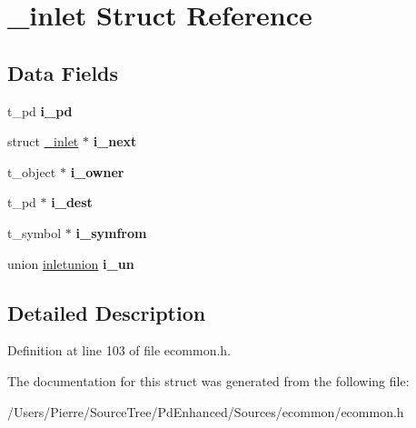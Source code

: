 \hypertarget{struct__inlet}{\section{\-\_\-inlet Struct Reference}
\label{struct__inlet}
}
\subsection*{Data Fields}
\begin{DoxyCompactItemize}
\item 
\hypertarget{struct__inlet_a2639bb3ac2a63922bf7393a675b28fd1}{t\-\_\-pd {\bfseries i\-\_\-pd}}\label{struct__inlet_a2639bb3ac2a63922bf7393a675b28fd1}

\item 
\hypertarget{struct__inlet_adb58549077d98b479e51d877e316ed31}{struct \hyperlink{struct__inlet}{\-\_\-inlet} $\ast$ {\bfseries i\-\_\-next}}\label{struct__inlet_adb58549077d98b479e51d877e316ed31}

\item 
\hypertarget{struct__inlet_aee881cb1182ca7632e843f9eb4503b30}{t\-\_\-object $\ast$ {\bfseries i\-\_\-owner}}\label{struct__inlet_aee881cb1182ca7632e843f9eb4503b30}

\item 
\hypertarget{struct__inlet_a7c16f89d729806fca332d345973b4231}{t\-\_\-pd $\ast$ {\bfseries i\-\_\-dest}}\label{struct__inlet_a7c16f89d729806fca332d345973b4231}

\item 
\hypertarget{struct__inlet_a534c2c39ea2fbb31ea35ce7eb60f8f43}{t\-\_\-symbol $\ast$ {\bfseries i\-\_\-symfrom}}\label{struct__inlet_a534c2c39ea2fbb31ea35ce7eb60f8f43}

\item 
\hypertarget{struct__inlet_a94954961ac07b15480857cece77f7065}{union \hyperlink{unioninletunion}{inletunion} {\bfseries i\-\_\-un}}\label{struct__inlet_a94954961ac07b15480857cece77f7065}

\end{DoxyCompactItemize}


\subsection{Detailed Description}


Definition at line 103 of file ecommon.\-h.



The documentation for this struct was generated from the following file\-:\begin{DoxyCompactItemize}
\item 
/\-Users/\-Pierre/\-Source\-Tree/\-Pd\-Enhanced/\-Sources/ecommon/ecommon.\-h\end{DoxyCompactItemize}
